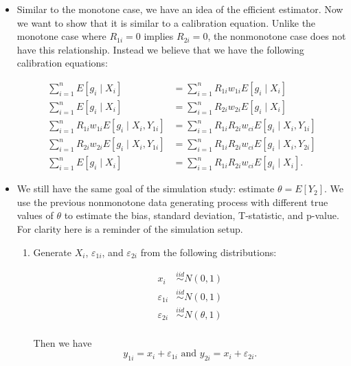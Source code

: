 \begin{itemize}
  \item Similar to the monotone case, we have an idea of the efficient
    estimator. Now we want to show that it is similar to a calibration equation.
    Unlike the monotone case where $R_{1i} = 0$ implies $R_{2i} = 0$, the
    nonmonotone case does not have this relationship. Instead we believe that we
    have the following calibration equations:

    \begin{align*}
      \sum_{i = 1}^n E[g_i \mid X_i] &= \sum_{i = 1}^n R_{1i} w_{1i} E[g_i \mid
      X_i]\\
      \sum_{i = 1}^n E[g_i \mid X_i] &= \sum_{i = 1}^n R_{2i} w_{2i} E[g_i \mid
      X_i]\\
      \sum_{i = 1}^n R_{1i} w_{1i} E[g_i \mid X_i, Y_{1i}] &= \sum_{i = 1}^n
      R_{1i} R_{2i} w_{ci} E[g_i \mid X_i, Y_{1i}]\\
      \sum_{i = 1}^n R_{2i} w_{2i} E[g_i \mid X_i, Y_{1i}] &= \sum_{i = 1}^n
      R_{1i} R_{2i} w_{ci} E[g_i \mid X_i, Y_{2i}]\\
      \sum_{i = 1}^n E[g_i \mid X_i] &= \sum_{i = 1}^n R_{1i} R_{2i} w_{ci}
      E[g_i \mid X_i].
    \end{align*}
  
  \item We still have the same goal of the simulation study: estimate $\theta =
    E[Y_2]$. We use the previous nonmonotone data generating process with
    different true values of $\theta$ to estimate the bias, standard deviation,
    T-statistic, and p-value. For clarity here is a reminder of the simulation
    setup.

    \begin{enumerate}
      \item Generate $X_i$, $\varepsilon_{1i}$, and $\varepsilon_{2i}$ from the
        following distributions:

        \begin{align*}
          x_i &\stackrel{iid}{\sim} N(0, 1)\\
          \varepsilon_{1i} &\stackrel{iid}{\sim} N(0, 1)\\
          \varepsilon_{2i} &\stackrel{iid}{\sim} N(\theta, 1)\\
        \end{align*}

        Then we have
        \[y_{1i} = x_i + \varepsilon_{1i} \text{ and } y_{2i} = x_i +
        \varepsilon_{2i}.\]


\end{enumerate}
\end{itemize}
